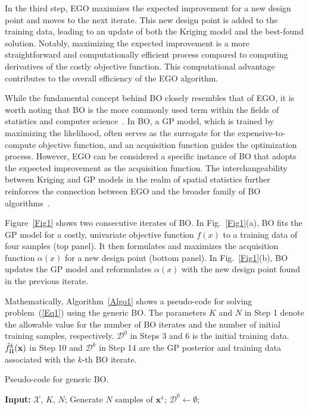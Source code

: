 \documentclass[iicol,sn-basic]{sn-jnl}%
\theoremstyle{thmstyleone}%
\theoremstyle{thmstyletwo}
\theoremstyle{thmstylethree}
\begin{document}
\begin{linenumbers}
In the third step, EGO maximizes the expected improvement for a new design point and moves to the next iterate.
This new design point is added to the training data, leading to an update of both the Kriging model and the best-found solution.
Notably, maximizing the expected improvement is a more straightforward and computationally efficient process compared to computing derivatives of the costly objective function.
This computational advantage contributes to the overall efficiency of the EGO algorithm.   

While the fundamental concept behind BO closely resembles that of EGO, it is worth noting that BO is the more commonly used term within the fields of statistics and computer science~\citep{Srinivas2010,Bull2011,Snoek2012,Shahriari2016,Frazier2018}.
In BO, a GP model, which is trained by maximizing the likelihood, often serves as the surrogate for the expensive-to-compute objective function, and an acquisition function guides the optimization process.
However, EGO can be considered a specific instance of BO that adopts the expected improvement as the acquisition function.
The interchangeability between Kriging and GP models in the realm of spatial statistics further reinforces the connection between EGO and the broader family of BO algorithms~\citep{Wang2023}.

Figure~\ref{Fig1} shows two consecutive iterates of BO.
In Fig.~\ref{Fig1}(a), BO fits the GP
model for a costly, univariate objective function $f(x)$ to a training data of
four samples (top panel).
It then formulates and maximizes the acquisition function $\alpha(x)$ for a new design point (bottom panel).
In Fig.~\ref{Fig1}(b), BO updates the GP model and reformulates $\alpha(x)$ with the new design point found in the previous iterate.

Mathematically, Algorithm~\ref{Algo1} shows a pseudo-code for solving problem~(\ref{Eq1}) using the generic BO.
The parameters $K$ and $N$ in Step 1 denote the allowable value for the number of BO iterates and the number of initial training samples, respectively.
$\mathcal{D}^{0}$ in Steps 3 and 6 is the initial training data.
$\hat{f}_\text{H}^k({\bf x})$ in Step 10 and $\mathcal{D}^{k}$ in Step 14 are the GP posterior and training data associated with the $k$-th BO iterate.

\begin{algorithm}
	\caption{Pseudo-code for generic BO.}\label{Algo1}
	\begin{algorithmic}[1]
		\State \textbf{Input:} $\mathcal{X}$, $K$, $N$;
		\State Generate $N$ samples of ${\bf x}^i$;
		\State $\mathcal{D}^0 \gets \emptyset$;
		

\end{algorithmic}
\end{algorithm}
\end{linenumbers}
\end{document}
